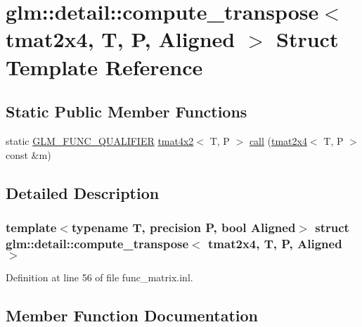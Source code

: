 \hypertarget{structglm_1_1detail_1_1compute__transpose_3_01tmat2x4_00_01_t_00_01_p_00_01_aligned_01_4}{}\section{glm\+::detail\+::compute\+\_\+transpose$<$ tmat2x4, T, P, Aligned $>$ Struct Template Reference}
\label{structglm_1_1detail_1_1compute__transpose_3_01tmat2x4_00_01_t_00_01_p_00_01_aligned_01_4}
\subsection*{Static Public Member Functions}
\begin{DoxyCompactItemize}
\item 
static \mbox{\hyperlink{setup_8hpp_a33fdea6f91c5f834105f7415e2a64407}{G\+L\+M\+\_\+\+F\+U\+N\+C\+\_\+\+Q\+U\+A\+L\+I\+F\+I\+ER}} \mbox{\hyperlink{structglm_1_1tmat4x2}{tmat4x2}}$<$ T, P $>$ \mbox{\hyperlink{structglm_1_1detail_1_1compute__transpose_3_01tmat2x4_00_01_t_00_01_p_00_01_aligned_01_4_af3c109154b85b056e50e42e36bba0371}{call}} (\mbox{\hyperlink{structglm_1_1tmat2x4}{tmat2x4}}$<$ T, P $>$ const \&m)
\end{DoxyCompactItemize}


\subsection{Detailed Description}
\subsubsection*{template$<$typename T, precision P, bool Aligned$>$\newline
struct glm\+::detail\+::compute\+\_\+transpose$<$ tmat2x4, T, P, Aligned $>$}



Definition at line 56 of file func\+\_\+matrix.\+inl.



\subsection{Member Function Documentation}
\mbox{\label{structglm_1_1detail_1_1compute__transpose_3_01tmat2x4_00_01_t_00_01_p_00_01_aligned_01_4_af3c109154b85b056e50e42e36bba0371}} 
